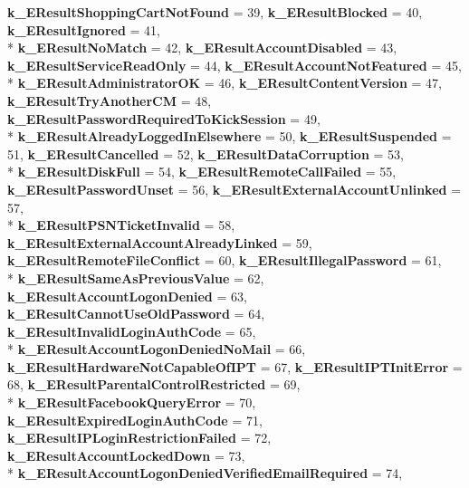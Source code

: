 \begin{DoxyCompactItemize}
{\bfseries k\+\_\+\+E\+Result\+Shopping\+Cart\+Not\+Found} = 39, 
{\bfseries k\+\_\+\+E\+Result\+Blocked} = 40, 
{\bfseries k\+\_\+\+E\+Result\+Ignored} = 41, 
\\*
{\bfseries k\+\_\+\+E\+Result\+No\+Match} = 42, 
{\bfseries k\+\_\+\+E\+Result\+Account\+Disabled} = 43, 
{\bfseries k\+\_\+\+E\+Result\+Service\+Read\+Only} = 44, 
{\bfseries k\+\_\+\+E\+Result\+Account\+Not\+Featured} = 45, 
\\*
{\bfseries k\+\_\+\+E\+Result\+Administrator\+O\+K} = 46, 
{\bfseries k\+\_\+\+E\+Result\+Content\+Version} = 47, 
{\bfseries k\+\_\+\+E\+Result\+Try\+Another\+C\+M} = 48, 
{\bfseries k\+\_\+\+E\+Result\+Password\+Required\+To\+Kick\+Session} = 49, 
\\*
{\bfseries k\+\_\+\+E\+Result\+Already\+Logged\+In\+Elsewhere} = 50, 
{\bfseries k\+\_\+\+E\+Result\+Suspended} = 51, 
{\bfseries k\+\_\+\+E\+Result\+Cancelled} = 52, 
{\bfseries k\+\_\+\+E\+Result\+Data\+Corruption} = 53, 
\\*
{\bfseries k\+\_\+\+E\+Result\+Disk\+Full} = 54, 
{\bfseries k\+\_\+\+E\+Result\+Remote\+Call\+Failed} = 55, 
{\bfseries k\+\_\+\+E\+Result\+Password\+Unset} = 56, 
{\bfseries k\+\_\+\+E\+Result\+External\+Account\+Unlinked} = 57, 
\\*
{\bfseries k\+\_\+\+E\+Result\+P\+S\+N\+Ticket\+Invalid} = 58, 
{\bfseries k\+\_\+\+E\+Result\+External\+Account\+Already\+Linked} = 59, 
{\bfseries k\+\_\+\+E\+Result\+Remote\+File\+Conflict} = 60, 
{\bfseries k\+\_\+\+E\+Result\+Illegal\+Password} = 61, 
\\*
{\bfseries k\+\_\+\+E\+Result\+Same\+As\+Previous\+Value} = 62, 
{\bfseries k\+\_\+\+E\+Result\+Account\+Logon\+Denied} = 63, 
{\bfseries k\+\_\+\+E\+Result\+Cannot\+Use\+Old\+Password} = 64, 
{\bfseries k\+\_\+\+E\+Result\+Invalid\+Login\+Auth\+Code} = 65, 
\\*
{\bfseries k\+\_\+\+E\+Result\+Account\+Logon\+Denied\+No\+Mail} = 66, 
{\bfseries k\+\_\+\+E\+Result\+Hardware\+Not\+Capable\+Of\+I\+P\+T} = 67, 
{\bfseries k\+\_\+\+E\+Result\+I\+P\+T\+Init\+Error} = 68, 
{\bfseries k\+\_\+\+E\+Result\+Parental\+Control\+Restricted} = 69, 
\\*
{\bfseries k\+\_\+\+E\+Result\+Facebook\+Query\+Error} = 70, 
{\bfseries k\+\_\+\+E\+Result\+Expired\+Login\+Auth\+Code} = 71, 
{\bfseries k\+\_\+\+E\+Result\+I\+P\+Login\+Restriction\+Failed} = 72, 
{\bfseries k\+\_\+\+E\+Result\+Account\+Locked\+Down} = 73, 
\\*
{\bfseries k\+\_\+\+E\+Result\+Account\+Logon\+Denied\+Verified\+Email\+Required} = 74, 

\end{DoxyCompactItemize}
